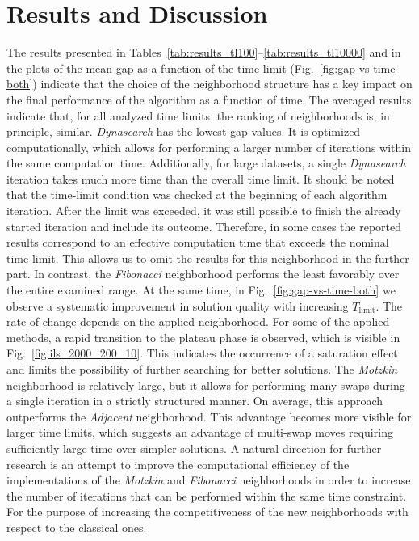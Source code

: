 \documentclass[runningheads]{llncs}
\begin{document}
\section{Results and Discussion}
The results presented in Tables~\ref{tab:results_tl100}--\ref{tab:results_tl10000} and in the plots of the mean gap as a function of the time limit (Fig.~\ref{fig:gap-vs-time-both}) indicate that the choice of the neighborhood structure has a key impact on the final performance of the algorithm as a function of time. The averaged results indicate that, for all analyzed time limits, the ranking of neighborhoods is, in principle, similar. \emph{Dynasearch} has the lowest gap values. It is optimized computationally, which allows for performing a larger number of iterations within the same computation time. Additionally, for large datasets, a single \emph{Dynasearch} iteration takes much more time than the overall time limit. It should be noted that the time-limit condition was checked at the beginning of each algorithm iteration. After the limit was exceeded, it was still possible to finish the already started iteration and include its outcome. Therefore, in some cases the reported results correspond to an effective computation time that exceeds the nominal time limit. This allows us to omit the results for this neighborhood in the further part. In contrast, the \emph{Fibonacci} neighborhood performs the least favorably over the entire examined range. At the same time, in Fig.~\ref{fig:gap-vs-time-both} we observe a systematic improvement in solution quality with increasing $T_{\text{limit}}$. The rate of change depends on the applied neighborhood. For some of the applied methods, a rapid transition to the plateau phase is observed, which is visible in Fig.~\ref{fig:ils_2000_200_10}. This indicates the occurrence of a saturation effect and limits the possibility of further searching for better solutions.
The \emph{Motzkin} neighborhood is relatively large, but it allows for performing many swaps during a single iteration in a strictly structured manner. On average, this approach outperforms the \emph{Adjacent} neighborhood. This advantage becomes more visible for larger time limits, which suggests an advantage of multi-swap moves requiring sufficiently large time over simpler solutions. A natural direction for further research is an attempt to improve the computational efficiency of the implementations of the \emph{Motzkin} and \emph{Fibonacci} neighborhoods in order to increase the number of iterations that can be performed within the same time constraint. For the purpose of increasing the competitiveness of the new neighborhoods with respect to the classical ones.







\end{document}
